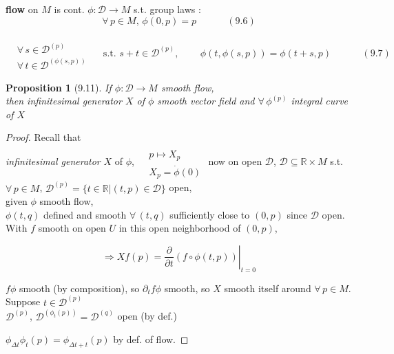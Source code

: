 \documentclass[11pt]{amsart}
\newtheorem{proposition}{Proposition}
\theoremstyle{definition}
\begin{document}
\textbf{flow} on $M$ is cont. $\phi : \mathcal{D} \to M$ s.t. group laws :
\begin{equation}
  \forall \, p \in M, \, \phi(0, p ) = p \quad \quad \quad \, (9.6)
\end{equation}

\begin{equation}
  \begin{aligned} & \quad \\
    & \forall \, s \in \mathcal{D}^{(p)} \\
    & \forall \, t \in \mathcal{D}^{ (\phi(s,p))} \end{aligned} \quad \text{ s.t. } s + t \in \mathcal{D}^{(p)}, \quad \quad \, \phi(t, \phi(s,p) ) = \phi(t+s, p ) \quad \quad \quad \, (9.7)
\end{equation}

\begin{proposition}[9.11] If $\phi: \mathcal{D} \to M$ smooth flow, \\
then infinitesimal generator $X$ of $\phi$ smooth vector field and $\forall \, \phi^{(p)}$ integral curve of $X$
\end{proposition}

\begin{proof}
Recall that  \\
\emph{infinitesimal generator} $X$ of $\phi$, $\begin{aligned} & \quad \\
  & p \mapsto X_p \\
  & X_p = \dot{\phi}(0) \end{aligned}$ \quad now on open $\mathcal{D}$, $\mathcal{D} \subseteq \mathbb{R} \times M$ s.t. $\forall \, p \in M$, $\mathcal{D}^{(p)} = \lbrace t \in \mathbb{R} | (t,p) \in \mathcal{D} \rbrace$ open, \\

given $\phi$ smooth flow, \\
\quad $\phi(t,q)$ defined and smooth $\forall \, (t,q)$ sufficiently close to $(0,p)$ since $\mathcal{D}$ open.  With $f$ smooth on open $U$ in this open neighborhood of $(0,p)$,

\[
\Longrightarrow Xf(p) = \left. \frac{ \partial }{ \partial t } (f \circ \phi(t,p)) \right|_{t=0}
\]

$f\phi$ smooth (by composition), so $\partial_t f\phi$ smooth, so $X$ smooth itself around $\forall \, p \in M$.   \\

Suppose $t\in \mathcal{D}^{(p)}$ \\
$\mathcal{D}^{(p)}$, $\mathcal{D}^{ (\phi_t(p))} = \mathcal{D}^{(q)}$ open (by def.)

$\phi_{\Delta t}\phi_t(p) = \phi_{ \Delta t + t }(p)$ by def. of flow.









\end{proof}
\end{document}
